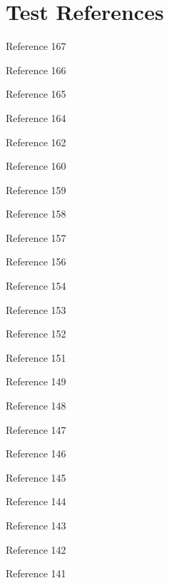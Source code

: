 \chapter{Test References}
Reference 167 \parencite{RefWorks:RefID:167-gardazi2025bert} \par
Reference 166 \parencite{RefWorks:RefID:166-mochales2009argumentation} \par
Reference 165 \parencite{RefWorks:RefID:165-bhattacharya2019comparative} \par
Reference 164 \parencite{RefWorks:RefID:164-aletras2016predicting} \par
Reference 162 \parencite{RefWorks:RefID:162-lairgi2024knowledge} \par
Reference 160 \parencite{RefWorks:RefID:160-xu2024large} \par
Reference 159 \parencite{RefWorks:RefID:159-ashley2017artificial} \par
Reference 158 \parencite{RefWorks:RefID:158-lewis2020retrievalaugmented} \par
Reference 157 \parencite{RefWorks:RefID:157-2017reading} \par
Reference 156 \parencite{RefWorks:RefID:156-gambhir2017recent} \par
Reference 154 \parencite{RefWorks:RefID:154-knublauch2017shapes} \par
Reference 153 \parencite{RefWorks:RefID:153-omran2020shacl} \par
Reference 152 \parencite{RefWorks:RefID:152-rabbani2022shacl} \par
Reference 151 \parencite{RefWorks:RefID:151-rabbani2023extraction} \par
Reference 149 \parencite{RefWorks:RefID:149-hitzler2009foundations} \par
Reference 148 \parencite{RefWorks:RefID:148-reiter1978on} \par
Reference 147 \parencite{RefWorks:RefID:147-bosco2024leading} \par
Reference 146 \parencite{RefWorks:RefID:146-sanders2024municipal} \par
Reference 145 \parencite{RefWorks:RefID:145-rau2024municipal} \par
Reference 144 \parencite{RefWorks:RefID:144-curley2024municipal} \par
Reference 143 \parencite{RefWorks:RefID:143-chia2022relation} \par
Reference 142 \parencite{RefWorks:RefID:142-wu2019enriching} \par
Reference 141 \parencite{RefWorks:RefID:141-kumar2017survey} \par
